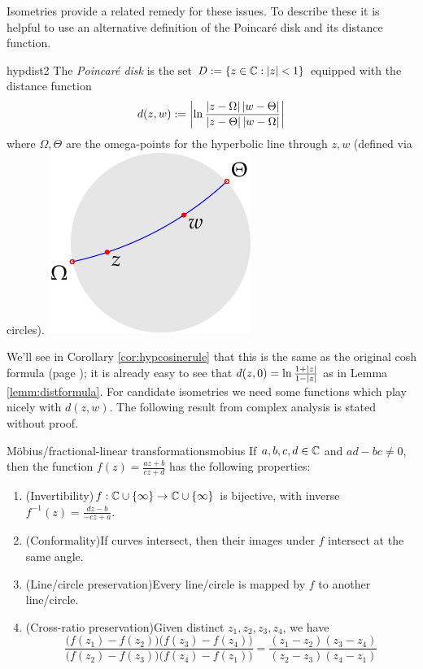 Isometries provide a related remedy for these issues. To describe these it is helpful to use an alternative definition of the Poincaré disk and its distance function.

\begin{defn}[lower separated=false, sidebyside, sidebyside align=top seam, sidebyside gap=0pt, righthand width=0.3\linewidth]{}{hypdist2}
	The \emph{Poincaré disk} is the set $D:=\{z\in\mathbb{C}:\left| z\right|<1\}$ equipped with the distance function
	\[
		d(z,w):=\left| \ln\frac{\left| z-\Omega\right|\left| w-\Theta\right|}{\left| z-\Theta\right|\left| w-\Omega\right|}\right|
	\]
	where $\Omega,\Theta$ are the omega-points for the hyperbolic line through $z,w$ (defined via circles).
	\tcblower
	\flushright\includegraphics{isom-dist}
\end{defn}

We'll see in Corollary \ref{cor:hypcosinerule} that this is the same as the original cosh formula (page \pageref{lemm:distformula}); it is already easy to see that $d(z,0)=\ln\frac{1+\left| z\right|}{1-\left| z\right|}$ as in Lemma \ref{lemm:distformula}. For candidate isometries we need some functions which play nicely with $d(z,w)$. The following result from complex analysis is stated without proof.


\begin{thm}{Möbius/fractional-linear transformations}{mobius}
	If $a,b,c,d\in\mathbb{C}$ and $ad-bc\neq 0$, then the function $f(z)=\tfrac{az+b}{cz+d}$ has the following properties:
	\begin{enumerate}
	  \item (Invertibility)\lstsp $f:\mathbb{C}\cup\{\infty\}\to \mathbb{C}\cup\{\infty\}$ is bijective, with inverse $f^{-1}(z)=\tfrac{dz-b}{-cz+a}$.
	  \item (Conformality)\lstsp If curves intersect, then their images under $f$ intersect at the same angle.
	  \item (Line/circle preservation)\lstsp Every line/circle\footnotemark{} is mapped by $f$ to another line/circle.
	  \item(Cross-ratio preservation)\lstsp Given distinct $z_1,z_2,z_3,z_4$, we have
		\[
			\frac{\big(f(z_1)-f(z_2)\big)\big(f(z_3)-f(z_4)\big)}{\big(f(z_2)-f(z_3)\big)\big(f(z_4)-f(z_1)\big)} =\frac{(z_1-z_2)(z_3-z_4)}{(z_2-z_3)(z_4-z_1)}
		\]
	\end{enumerate}
\end{thm}

